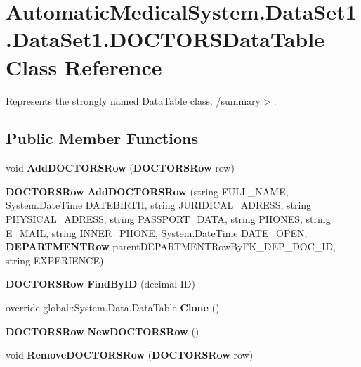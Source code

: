 \section{AutomaticMedicalSystem.DataSet1.DataSet1.DOCTORSDataTable Class Reference}
\label{class_automatic_medical_system_1_1_data_set1_1_1_d_o_c_t_o_r_s_data_table}
Represents the strongly named DataTable class. /summary$>$.  


\subsection*{Public Member Functions}
\begin{CompactItemize}
\item 
void \textbf{AddDOCTORSRow} ({\bf DOCTORSRow} row)\label{class_automatic_medical_system_1_1_data_set1_1_1_d_o_c_t_o_r_s_data_table_488052c26acc71cbd70ac7f7329506e8}

\item 
{\bf DOCTORSRow} \textbf{AddDOCTORSRow} (string FULL\_\-NAME, System.DateTime DATEBIRTH, string JURIDICAL\_\-ADRESS, string PHYSICAL\_\-ADRESS, string PASSPORT\_\-DATA, string PHONES, string E\_\-MAIL, string INNER\_\-PHONE, System.DateTime DATE\_\-OPEN, {\bf DEPARTMENTRow} parentDEPARTMENTRowByFK\_\-DEP\_\-DOC\_\-ID, string EXPERIENCE)\label{class_automatic_medical_system_1_1_data_set1_1_1_d_o_c_t_o_r_s_data_table_d872943e2584919c24bb6d2a14bb2ea9}

\item 
{\bf DOCTORSRow} \textbf{FindByID} (decimal ID)\label{class_automatic_medical_system_1_1_data_set1_1_1_d_o_c_t_o_r_s_data_table_d93ee2a4e009dd96057cf9173aad9a8c}

\item 
override global::System.Data.DataTable \textbf{Clone} ()\label{class_automatic_medical_system_1_1_data_set1_1_1_d_o_c_t_o_r_s_data_table_88bd15d07b80bca0ccebe36bb9ff4514}

\item 
{\bf DOCTORSRow} \textbf{NewDOCTORSRow} ()\label{class_automatic_medical_system_1_1_data_set1_1_1_d_o_c_t_o_r_s_data_table_75c65782c91b6d6e42d819155b3c9c2c}

\item 
void \textbf{RemoveDOCTORSRow} ({\bf DOCTORSRow} row)\label{class_automatic_medical_system_1_1_data_set1_1_1_d_o_c_t_o_r_s_data_table_f9700697549c8e4da759e9d7183e5a82}

\end{CompactItemize}
